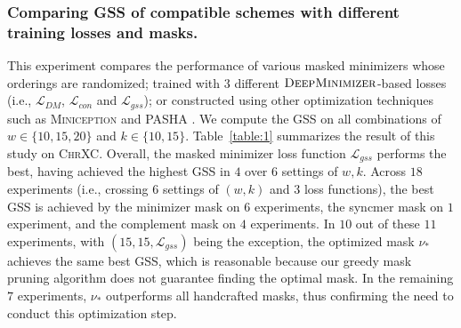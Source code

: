 \subsubsection{Comparing GSS of compatible schemes with different training losses and masks.} This experiment compares the performance of various masked minimizers whose orderings are randomized; trained with $3$ different $\textsc{DeepMinimizer}$-based losses (i.e., $\mathcal{L}_{DM}$, $\mathcal{L}_{con}$ and $\mathcal{L}_{gss}$); or constructed using other optimization techniques such as \textsc{Miniception} \cite{zheng20miniception} and \textsc{PASHA} \cite{ekim20pasha}. We compute the GSS on all combinations of $w \in \{10, 15, 20\}$ and $k \in \{10, 15\}$. Table~\ref{table:1} summarizes the result of this study on \textsc{ChrXC}. Overall, the masked minimizer loss function $\mathcal{L}_{gss}$ performs the best, having achieved the highest GSS in $4$ over $6$ settings of $w, k$. Across $18$ experiments (i.e., crossing $6$ settings of $(w, k)$ and $3$ loss functions), the best GSS is achieved by the minimizer mask on $6$ experiments, the syncmer mask on $1$ experiment, and the complement mask on $4$ experiments. In $10$ out of these $11$ experiments, with $(15,15,\mathcal{L}_{gss})$ being the exception, the optimized mask $\nu_\ast$ achieves the same best GSS, which is reasonable because our greedy mask pruning algorithm does not guarantee finding the optimal mask. In the remaining $7$ experiments, $\nu_\ast$ outperforms all handcrafted masks, thus confirming the need to conduct this optimization step.  

